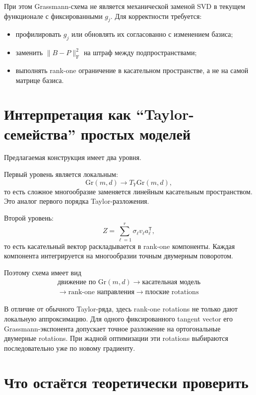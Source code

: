 \documentclass[11pt,a4paper]{article}
\newcommand{\T}{^{\mathsf T}}
\newcommand{\F}{_{\mathrm F}}
\newcommand{\Gr}{\mathrm{Gr}}
\begin{document}
При этом Grassmann-схема не является механической заменой SVD в
текущем функционале с фиксированными \(g_j\). Для корректности требуется:

\begin{itemize}
    \item профилировать \(g_j\) или обновлять их согласованно с
    изменением базиса;
    \item заменить \(\|B-P\|\F^2\) на штраф между подпространствами;
    \item выполнять rank-one ограничение в касательном пространстве,
    а не на самой матрице базиса.
\end{itemize}

\section{Интерпретация как ``Taylor-семейства'' простых моделей}

Предлагаемая конструкция имеет два уровня.

Первый уровень является локальным:
\[
    \Gr(m,d)
    \longrightarrow
    T_Y\Gr(m,d),
\]
то есть сложное многообразие заменяется линейным касательным
пространством. Это аналог первого порядка Taylor-разложения.

Второй уровень:
\[
    Z
    =
    \sum_{\ell=1}^r
    \sigma_\ell v_\ell a_\ell\T,
\]
то есть касательный вектор раскладывается в rank-one компоненты.
Каждая компонента интегрируется на многообразии точным двумерным
поворотом.

Поэтому схема имеет вид
\[
    \boxed{
    \begin{gathered}
    \text{движение по }\Gr(m,d)
    \longrightarrow
    \text{касательная модель}\\
    \longrightarrow
    \text{rank-one направления}
    \longrightarrow
    \text{плоские rotations}
    \end{gathered}
    }
\]

В отличие от обычного Taylor-ряда, здесь rank-one rotations не только
дают локальную аппроксимацию. Для одного фиксированного tangent vector
его Grassmann-экспонента допускает точное разложение на ортогональные
двумерные rotations. При жадной оптимизации эти rotations выбираются
последовательно уже по новому градиенту.

\section{Что остаётся теоретически проверить}
\end{document}
